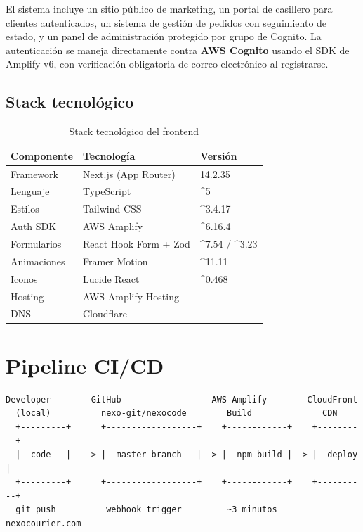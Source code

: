 \documentclass[12pt,a4paper]{article}
\begin{document}
\vspace{0.5em}
El sistema incluye un sitio público de marketing, un portal de casillero para clientes
autenticados, un sistema de gestión de pedidos con seguimiento de estado, y un panel de
administración protegido por grupo de Cognito. La autenticación se maneja directamente
contra \textbf{AWS Cognito} usando el SDK de Amplify v6, con verificación obligatoria
de correo electrónico al registrarse.

\subsection{Stack tecnológico}

\begin{table}[H]
\centering
\begin{tabular}{@{}lll@{}}
\toprule
\textbf{Componente} & \textbf{Tecnología} & \textbf{Versión} \\
\midrule
Framework & Next.js (App Router) & 14.2.35 \\
Lenguaje & TypeScript & \textasciicircum{}5 \\
Estilos & Tailwind CSS & \textasciicircum{}3.4.17 \\
Auth SDK & AWS Amplify & \textasciicircum{}6.16.4 \\
Formularios & React Hook Form + Zod & \textasciicircum{}7.54 / \textasciicircum{}3.23 \\
Animaciones & Framer Motion & \textasciicircum{}11.11 \\
Iconos & Lucide React & \textasciicircum{}0.468 \\
Hosting & AWS Amplify Hosting & -- \\
DNS & Cloudflare & -- \\
\bottomrule
\end{tabular}
\caption{Stack tecnológico del frontend}
\end{table}

\section{Pipeline CI/CD}

\begin{lstlisting}[caption={Pipeline de despliegue automático}, numbers=none]
  Developer        GitHub                  AWS Amplify        CloudFront
  (local)          nexo-git/nexocode        Build              CDN
  +---------+      +------------------+    +------------+    +----------+
  |  code   | ---> |  master branch   | -> |  npm build | -> |  deploy  |
  +---------+      +------------------+    +------------+    +----------+
  git push          webhook trigger         ~3 minutos         nexocourier.com
\end{lstlisting}
\end{document}

